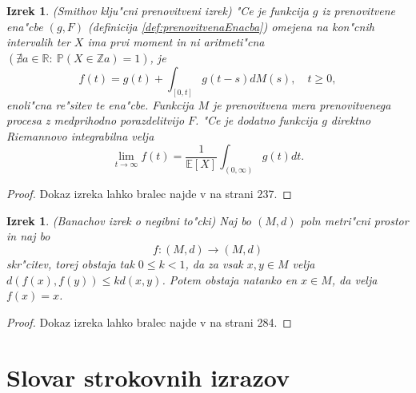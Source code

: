 \documentclass[12pt, a4paper, reqno]{amsart}
\theoremstyle{definition}
\theoremstyle{plain}
\newtheorem{izrek}[definicija]{Izrek}
\newcommand{\R}{\mathbb{R}}
\newcommand{\E}{\mathbb{E}}
\newcommand{\Prob}{\mathbb{P}}
\newcommand{\1}{\mathds{1}}
\begin{document}
    \begin{izrek}(Smithov klju"cni prenovitveni izrek)
        "Ce je funkcija $g$ iz prenovitvene ena"cbe $(g, F)$ (definicija \ref{def:prenovitvenaEnacba})
        omejena na kon"cnih intervalih ter $X$ ima prvi moment in ni aritmeti"cna 
        $(\nexists a\in\R: \ \Prob\left(X \in \mathbb{Z} a\right) = 1)$, je
        \begin{equation*}
            f(t) = g(t) +  \int_{[0, t]}g(t - s)dM(s), \quad t\geq 0,
        \end{equation*}
        enoli"cna re"sitev te ena"cbe. Funkcija $M$ je prenovitvena mera prenovitvenega procesa z medprihodno 
        porazdelitvijo $F$.
        "Ce je dodatno funkcija $g$ direktno Riemannovo integrabilna velja 
        \begin{equation*}
            \lim_{t\to\infty}f(t) = \frac{1}{\E\left[X\right]}\int_{(0, \infty)}g(t)dt.
        \end{equation*}
        \label{izr:Smith}
    \end{izrek}

    \begin{proof}
        Dokaz izreka lahko bralec najde v \cite{8} na strani 237. 
    \end{proof}

    \begin{izrek}(Banachov izrek o negibni to"cki)
        Naj bo $(M, d)$ poln metri"cni prostor in naj bo 
        $$
            f:(M, d) \to (M, d)
        $$
        skr"citev, torej obstaja tak $0 \leq k < 1$, da za vsak $x, y \in M$ velja 
        $d(f(x), f(y)) \leq k d(x, y)$. Potem obstaja natanko en $x\in M$, da velja $f(x) = x$.
         \label{izr:Banach}
    \end{izrek}

    \begin{proof}
        Dokaz izreka lahko bralec najde v \cite{11} na strani 284.
    \end{proof}


\section*{Slovar strokovnih izrazov}
\end{document}
